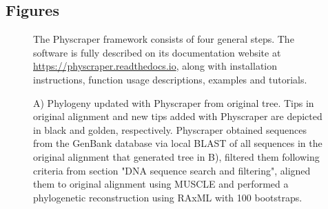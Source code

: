 \documentclass{bmcart}
\begin{document}
\begin{backmatter}
\section*{Figures}
  \begin{figure}[h!]
  \caption{The Physcraper framework consists of four general steps. The software is fully
  described on its documentation website at \href{https://physcraper.readthedocs.io}{https://physcraper.readthedocs.io},
  along with installation instructions, function usage descriptions, examples and tutorials.
}
\end{figure}

\begin{figure}[h!]
  \caption{A) Phylogeny updated with Physcraper from original
  \cite{gottlieb2005molecular} tree.
  Tips in original alignment and new tips added with Physcraper are depicted in
  black and golden, respectively. Physcraper obtained sequences from the GenBank
  database via local BLAST of all sequences in the original alignment that generated
  tree in B), filtered them following criteria from section "DNA sequence search and
  filtering", aligned them to original alignment using MUSCLE and performed a
  phylogenetic reconstruction using RAxML with 100 bootstraps.}
\end{figure}


\end{backmatter}
\end{document}
